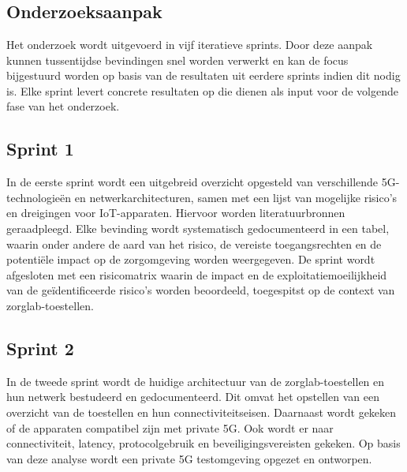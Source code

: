 
\chapter{}%
\label{ch:methodologie}

\section*{Onderzoeksaanpak}

Het onderzoek wordt uitgevoerd in vijf iteratieve sprints. Door deze aanpak kunnen tussentijdse bevindingen snel worden verwerkt en kan de focus bijgestuurd worden op basis van de resultaten uit eerdere sprints indien dit nodig is. Elke sprint levert concrete resultaten op die dienen als input voor de volgende fase van het onderzoek.

\section*{Sprint 1}

In de eerste sprint wordt een uitgebreid overzicht opgesteld van verschillende 5G-technologieën en netwerkarchitecturen, samen met een lijst van mogelijke risico’s en dreigingen voor IoT-apparaten. Hiervoor worden literatuurbronnen geraadpleegd. Elke bevinding wordt systematisch gedocumenteerd in een tabel, waarin onder andere de aard van het risico, de vereiste toegangsrechten en de potentiële impact op de zorgomgeving worden weergegeven. De sprint wordt afgesloten met een risicomatrix waarin de impact en de exploitatiemoeilijkheid van de geïdentificeerde risico’s worden beoordeeld, toegespitst op de context van zorglab-toestellen.

\section*{Sprint 2}

In de tweede sprint wordt de huidige architectuur van de zorglab-toestellen en hun netwerk bestudeerd en gedocumenteerd. Dit omvat het opstellen van een overzicht van de toestellen en hun connectiviteitseisen. Daarnaast wordt gekeken of de apparaten compatibel zijn met private 5G. Ook wordt er naar connectiviteit, latency, protocolgebruik en beveiligingsvereisten gekeken. Op basis van deze analyse wordt een private 5G testomgeving opgezet en ontworpen.

